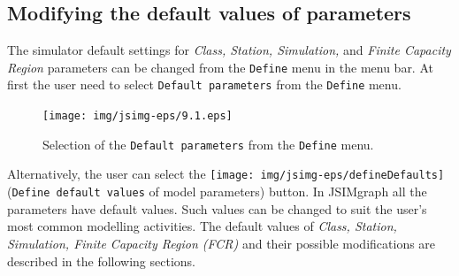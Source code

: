 \subsection{Modifying the default values of parameters}
\label{modefpara} The simulator default settings for \emph{Class,
Station, Simulation,} and \emph{Finite Capacity Region} parameters
can be changed from the \texttt{Define} menu in the menu bar. At
first the user need to select \texttt{Default parameters} from the
\texttt{Define} menu.
\begin{figure}[htb]
    \begin{center}
        \texttt{[image: img/jsimg-eps/9.1.eps]}
    \end{center}
    \caption{Selection of the \texttt{Default parameters} from the
    \texttt{Define} menu.}
    \label{fig:seldepardef}
\end{figure}
Alternatively, the user can select the
\texttt{[image: img/jsimg-eps/defineDefaults]} (\texttt{Define
default values} of model parameters) button. In JSIMgraph all the
parameters have default values. Such values can be changed to suit
the user's most common modelling activities. The default values of
\emph{Class, Station, Simulation, Finite Capacity Region (FCR)}
and their possible modifications are described in the
following sections.\\

